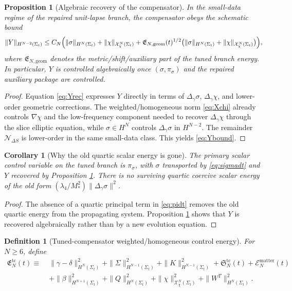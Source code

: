 \documentclass[11pt]{article}
\newtheorem{definition}{Definition}
\newtheorem{proposition}{Proposition}
\newtheorem{corollary}{Corollary}
\begin{document}
\begin{proposition}[Algebraic recovery of the compensator]
\label{prop:Ycontrol}
In the small-data regime of the repaired unit-lapse branch, the compensator obeys the schematic bound
\begin{equation}
\|Y\|_{H^{N-2}(\Sigma_t)}
\le
C_N
\Bigl(
\|\sigma\|_{H^N(\Sigma_t)}
+\|\chi\|_{\mathcal X_\chi^N(\Sigma_t)}
+\mathfrak E_{N,\mathrm{geom}}(t)^{1/2}
\bigl(
\|\sigma\|_{H^N(\Sigma_t)}
+\|\chi\|_{\mathcal X_\chi^N(\Sigma_t)}
\bigr)
\Bigr),
\label{eq:Ybound}
\end{equation}
where \(\mathfrak E_{N,\mathrm{geom}}\) denotes the metric/shift/auxiliary part of the tuned branch energy. In particular, \(Y\) is controlled algebraically once \((\sigma,\pi_\sigma)\) and the repaired auxiliary package are controlled.
\end{proposition}

\begin{proof}
Equation \eqref{eq:Yrec} expresses \(Y\) directly in terms of \(\Delta_\gamma\sigma\), \(\Delta_\gamma\chi\), and lower-order geometric corrections. The weighted/homogeneous norm \eqref{eq:Xchi} already controls \(\nabla\chi\) and the low-frequency component needed to recover \(\Delta_\gamma\chi\) through the slice elliptic equation, while \(\sigma\in H^N\) controls \(\Delta_\gamma\sigma\) in \(H^{N-2}\). The remainder \(\mathcal N_{\Delta S}\) is lower-order in the same small-data class. This yields \eqref{eq:Ybound}.
\end{proof}

\begin{corollary}[Why the old quartic scalar energy is gone]
\label{cor:scalarpackage}
The primary scalar control variable on the tuned branch is \(\pi_\sigma\), with \(\sigma\) transported by \eqref{eq:sigmadt} and \(Y\) recovered by Proposition \ref{prop:Ycontrol}. There is no surviving quartic coercive scalar energy of the old form \((\lambda_4/M_*^2)\|\Delta_\gamma\sigma\|^2\).
\end{corollary}

\begin{proof}
The absence of a quartic principal term in \eqref{eq:pidt} removes the old quartic energy from the propagating system. Proposition \ref{prop:Ycontrol} shows that \(Y\) is recovered algebraically rather than by a new evolution equation.
\end{proof}

\begin{definition}[Tuned-compensator weighted/homogeneous control energy]
\label{def:Etc}
For \(N\ge 6\), define
\begin{align}
\mathfrak E_N^{\mathrm{tc}}(t)
\equiv\;&
\|\gamma-\delta\|_{H^N(\Sigma_t)}^2
+\|\Sigma\|_{H^{N-1}(\Sigma_t)}^2
+\|K\|_{H^{N-1}(\Sigma_t)}^2
+\mathfrak S_N^{\mathrm{tc}}(t)
+\mathcal E_N^{\mathrm{matter}}(t)
\nonumber\\
&+\|\beta\|_{H^{N+1}(\Sigma_t)}^2
+\|Q\|_{H^N(\Sigma_t)}^2
+\|\chi\|_{\mathcal X_\chi^N(\Sigma_t)}^2
+\|W^T\|_{H^N(\Sigma_t)}^2.
\label{eq:Etc}
\end{align}
\end{definition}
\end{document}
